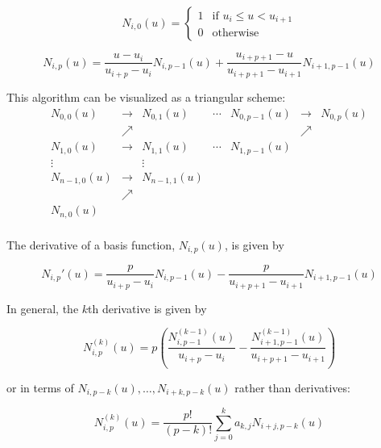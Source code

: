 \begin{equation} 
N_{i,0}(u) = 
\begin{cases} 
1 & \text{if  } u_i \leq u < u_{i+1} \\
0 & \text{otherwise}
\end{cases} 
\end{equation}

\begin{equation} N_{i,p}(u) = \frac{u-u_i}{u_{i+p}-u_i} N_{i,p-1}(u) + \frac{u_{i+p+1}-u}{u_{i+p+1}-u_{i+1}}N_{i+1,p-1}(u) \end{equation}

\bigskip

This algorithm can be visualized as a triangular scheme:
\begin{equation}
\begin{matrix}
	N_{0,0}(u) & \rightarrow & N_{0,1}(u) & \cdots & N_{0,p-1}(u) & \rightarrow & N_{0,p}(u)\\ 
	& \nearrow &  &  &  & \nearrow & \\ 
	N_{1,0}(u) & \rightarrow & N_{1,1}(u) & \cdots & N_{1,p-1}(u) &  & \\ 
	\vdots &  & \vdots &  &  &  & \\ 
	N_{n-1,0}(u) & \rightarrow & N_{n-1,1}(u) &  &  &  & \\ 
	& \nearrow &  &  &  &  & \\ 
	N_{n,0}(u) &  &  &  &  &  & \\ 
\end{matrix}
\end{equation}

The derivative of a basis function, $N_{i,p}(u)$, is given by

\begin{equation}N_{i,p}'(u) = \frac{p}{u_{i+p} - u_i} N_{i,p-1}(u) - \frac{p}{u_{i+p+1} - u_{i+1}} N_{i+1,p-1}(u)  \end{equation}

In general, the $k$th derivative is given by

\begin{equation}N_{i,p}^{(k)}(u) = p \left( \frac{N_{i,p-1}^{(k-1)}(u)}{u_{i+p} - u_i} - \frac{N_{i+1,p-1}^{(k-1)}(u)}{u_{i+p+1} - u_{i+1}} \right) \end{equation}

or in terms of $N_{i,p-k}(u), \ldots, N_{i+k,p-k}(u)$ rather than derivatives:

\begin{equation} N_{i,p}^{(k)}(u) = \frac{p!}{(p-k)!} \sum^k_{j=0} a_{k,j} N_{i+j,p-k}(u)  \end{equation}

